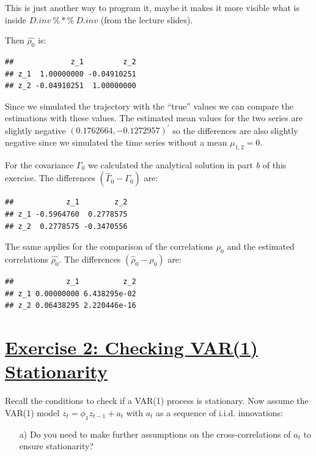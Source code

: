 \documentclass[12pt,a4paper]{article}
\newcommand{\tmpsection}[1]{}
\let\tmpsection=\section
\renewcommand{\section}[1]{\tmpsection{\underline{#1}} }
\begin{document}
This is just another way to program it, maybe it makes it more visible
what is inside \(D.inv \ \%*\% \ D.inv\) (from the lecture slides).

Then \(\widehat{\rho_0}\) is:

\begin{verbatim}
##             z_1         z_2
## z_1  1.00000000 -0.04910251
## z_2 -0.04910251  1.00000000
\end{verbatim}

Since we simulated the trajectory with the \enquote{true} values we can
compare the estimations with these values. The estimated mean values for
the two series are slightly negative \((0.1762664, -0.1272957 )^{'}\) so
the differences are also slightly negative since we simulated the time
series without a mean \(\mu_{1,2} = 0\).

For the covariance \(\Gamma_0\) we calculated the analytical solution in
part \emph{b} of this exercise. The differences
\((\widehat{\Gamma}_0 - \Gamma_0)\) are:

\begin{verbatim}
##            z_1        z_2
## z_1 -0.5964760  0.2778575
## z_2  0.2778575 -0.3470556
\end{verbatim}

The same applies for the comparison of the correlations \(\rho_0\) and
the estimated correlations \(\widehat{\rho_0}\). The differences
\((\widehat{\rho}_0 - \rho_0 )\) are:

\begin{verbatim}
##            z_1          z_2
## z_1 0.00000000 6.438295e-02
## z_2 0.06438295 2.220446e-16
\end{verbatim}

\hypertarget{exercise-2-checking-var1-stationarity}{%
\section{Exercise 2: Checking VAR(1)
Stationarity}\label{exercise-2-checking-var1-stationarity}}

Recall the conditions to check if a VAR(1) process is stationary. Now
assume the VAR(1) model \(z_{t} = \phi_{1} z_{t-1} + a_{t}\) with
\(a_{t}\) as a sequence of i.i.d. innovations:

\begin{itemize}
\item[a)] Do you need to make further assumptions on the cross-correlations of $a_{t}$ to ensure stationarity?
\end{itemize}
\end{document}

